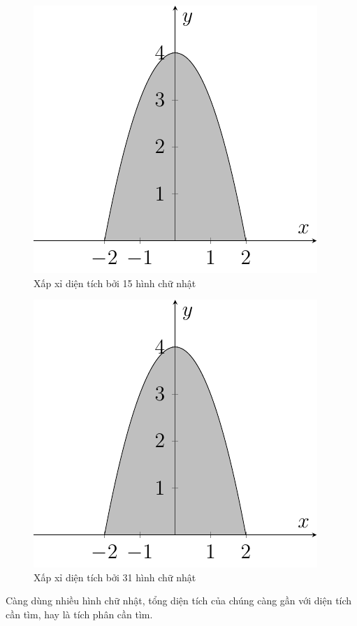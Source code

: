 \begin{figure}[htb]
	\centering
	\includegraphics[page=3]{analytic_geometry/int1.pdf}
	\caption{Xấp xỉ diện tích bởi 15 hình chữ nhật}
	\label{int3}
\end{figure}

\begin{figure}[htb]
	\centering
	\includegraphics[page=4]{analytic_geometry/int1.pdf}
	\caption{Xấp xỉ diện tích bởi 31 hình chữ nhật}
	\label{int4}
\end{figure}

Càng dùng nhiều hình chữ nhật, tổng diện tích của chúng càng gần với diện tích cần tìm, hay là tích phân cần tìm.

